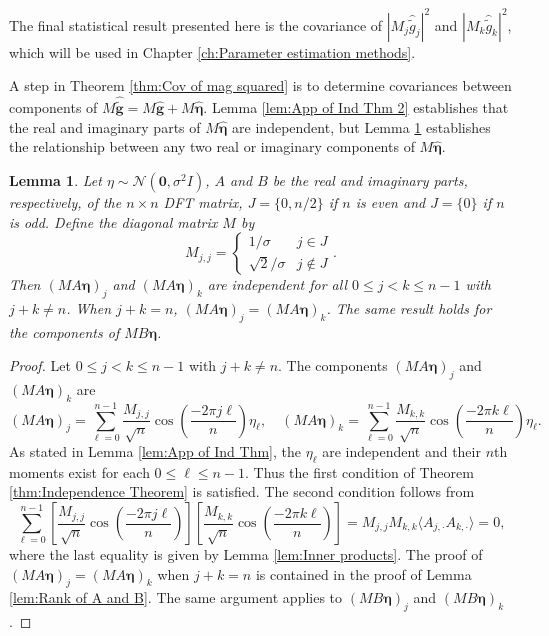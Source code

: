 \documentclass[12pt,notitlepage]{report}
\newcommand{\gVec}{\mathbf{g}}	%
\newcommand{\gnoise}{\widetilde{g}}	%
\newcommand{\gnoiseVec}{\widetilde{\mathbf{g}}}	%
\newcommand{\noise}{\eta}	%
\newcommand{\noiseSD}{\sigma}	%
\newcommand{\noiseVec}{\bm{\noise}}	%
\newtheorem{lemma}{Lemma}[section]
\begin{document}
The final statistical result presented here is the covariance of $|M_j\widehat{\gnoise}_j|^2$ and $|M_k\widehat{\gnoise}_k|^2$, which will be used in Chapter \ref{ch:Parameter estimation methods}.  

A step in Theorem \ref{thm:Cov of mag squared} is to determine covariances between components of $M\widehat{\gnoiseVec} = M\widehat{\gVec} + M\widehat{\noiseVec}$. Lemma \ref{lem:App of Ind Thm 2} establishes that the real and imaginary parts of $M\widehat{\noiseVec}$ are independent, but Lemma \ref{lem:App of Ind Thm 3} establishes the relationship between any two real or imaginary components of $M\widehat{\noiseVec}$.

\begin{lemma}
\label{lem:App of Ind Thm 3}
Let $\noise \sim \mathcal{N}(\bm{0},\noiseSD^2 I)$, $A$ and $B$ be the real and imaginary parts, respectively, of the $n \times n$ DFT matrix, $J = \{0,n/2\}$ if $n$ is even and $J = \{0\}$ if $n$ is odd. Define the diagonal matrix $M$ by
\[M_{j,j} = \begin{cases}
1/\noiseSD & j \in J \\
\sqrt{2}/\noiseSD & j \not\in J
\end{cases}.\]
Then $(MA\noiseVec)_j$ and $(MA\noiseVec)_k$ are independent for all $0 \leq j < k \leq n-1$ with $j + k \neq n$. When $j + k = n$, $(MA\noiseVec)_j = (MA\noiseVec)_k$. The same result holds for the components of $MB\noiseVec$.
\end{lemma}
\begin{proof}
Let $0 \leq j < k \leq n-1$ with $j + k \neq n$. The components $(MA\noiseVec)_j$ and $(MA\noiseVec)_k$ are
\[(MA\noiseVec)_j = \sum_{\ell=0}^{n-1} \frac{M_{j,j}}{\sqrt{n}}\cos\left(\frac{-2\pi{j\ell}}{n}\right)\noise_{\ell}, \quad (MA\noiseVec)_k = \sum_{\ell=0}^{n-1} \frac{M_{k,k}}{\sqrt{n}}\cos\left(\frac{-2\pi{k\ell}}{n}\right)\noise_{\ell}.\]
As stated in Lemma \ref{lem:App of Ind Thm}, the $\noise_\ell$ are independent and their $n$th moments exist for each $0 \leq \ell \leq n-1$. Thus the first condition of Theorem \ref{thm:Independence Theorem} is satisfied. The second condition follows from
\[\sum_{\ell=0}^{n-1} \left[\frac{M_{j,j}}{\sqrt{n}}\cos\left(\frac{-2\pi{j\ell}}{n}\right)\right]\left[\frac{M_{k,k}}{\sqrt{n}}\cos\left(\frac{-2\pi{k\ell}}{n}\right)\right] = M_{j,j}M_{k,k} \langle A_{j,\cdot}A_{k,\cdot} \rangle = 0,\]
where the last equality is given by Lemma \ref{lem:Inner products}. The proof of $(MA\noiseVec)_j = (MA\noiseVec)_k$ when $j+k = n$ is contained in the proof of Lemma \ref{lem:Rank of A and B}. The same argument applies to $(MB\noiseVec)_j$ and $(MB\noiseVec)_k$.
\end{proof}
\end{document}
